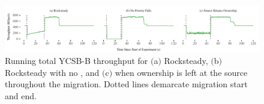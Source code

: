 \begin{figure}[t]
\centering
\includegraphics[width=1.0\textwidth]{graphs/rocksteady-throughput.pdf}
\caption{Running total YCSB-B throughput for $($a$)$ Rocksteady, $($b$)$
  Rocksteady with no \priopulls, and $($c$)$ when ownership is left at
  the source throughout the migration. Dotted lines demarcate
  migration start and end.}
\label{fig:running-throughput}
\end{figure}
